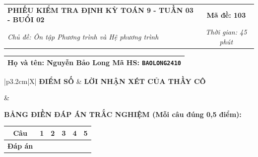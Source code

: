 \documentclass[12pt,a4paper]{article}
\begin{document}
\newpage


\noindent
\begin{tabularx}{\linewidth}{|X|c|}
\hline
\textbf{PHIẾU KIỂM TRA ĐỊNH KỲ TOÁN 9 - TUẦN 03 - BUỔI 02} & \textbf{Mã đề: 103} \\
\textit{Chủ đề: Ôn tập Phương trình và Hệ phương trình} & \textit{Thời gian: 45 phút} \\
\hline
\end{tabularx}

\vspace{1mm}

\noindent
\begin{tabularx}{\linewidth}{|X|}
\hline
\rule[-2mm]{0pt}{7.5mm}\textbf{Họ và tên:} \textbf{\large Nguyễn Bảo Long} \hfill \textbf{Mã HS:} \texttt{BAOLONG2410} \quad \\
\hline
\end{tabularx}

\vspace{1mm}

\noindent
\begin{tabularx}{\linewidth}{|p{3.2cm}|X|}
\hline
\centering\textbf{ĐIỂM SỐ} & \centering\textbf{LỜI NHẬN XÉT CỦA THẦY CÔ} \tabularnewline
\hline
\rule{0pt}{1.3cm} & \tabularnewline
\hline
\end{tabularx}

\vspace{1.2mm}

\noindent\textbf{BẢNG ĐIỀN ĐÁP ÁN TRẮC NGHIỆM (Mỗi câu đúng 0,5 điểm):}
\vspace{0.8mm}

\noindent
\renewcommand{\arraystretch}{1.35}
\begin{tabularx}{\linewidth}{|c|*{5}{>{\centering\arraybackslash}X|}}
\hline
\textbf{Câu} & \textbf{1} & \textbf{2} & \textbf{3} & \textbf{4} & \textbf{5} \\
\hline
\textbf{Đáp án} & & & & & \\
\hline
\end{tabularx}
\renewcommand{\arraystretch}{1.0}

\vspace{1.5mm}
\end{document}
